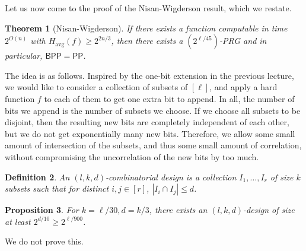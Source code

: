 \documentclass{article}
\newcounter{lecnum}
\newtheorem{theorem}{Theorem}[lecnum]
\newtheorem{proposition}[theorem]{Proposition}
\newtheorem{definition}[theorem]{Definition}
\newcommand{\BPP}{\mathsf{BPP}}
\newcommand{\PP}{\mathsf{PP}}
\newcommand{\avg}{\text{avg}}
\begin{document}
		Let us now come to the proof of the Nisan-Wigderson result, which we restate.
		\begin{theorem}[Nisan-Wigderson]
			\label{theo: hard to prg}
			If there exists a function computable in time $2^{O(n)}$ with $H_\avg(f) \ge 2^{2n/3}$, then there exists a $(2^{\ell/45})$-PRG and in particular, $\BPP = \PP$.
		\end{theorem}
	

		The idea is as follows. Inspired by the one-bit extension in the previous lecture, we would like to consider a collection of subsets of $[\ell]$, and apply a hard function $f$ to each of them to get one extra bit to append. In all, the number of bits we append is the number of subsets we choose. If we choose all subsets to be disjoint, then the resulting new bits are completely independent of each other, but we do not get exponentially many new bits. Therefore, we allow some small amount of intersection of the subsets, and thus some small amount of correlation, without compromising the uncorrelation of the new bits by too much.

		\begin{definition}
			An \emph{$(l,k,d)$-combinatorial design} is a collection $I_1,\ldots,I_r$ of size $k$ subsets such that for distinct $i,j \in [r]$, $|I_i \cap I_j| \le d$.
		\end{definition}

		\begin{proposition}
			For $k=\ell/30, d=k/3$, there exists an $(l,k,d)$-design of size at least $2^{d/10} \ge 2^{\ell/900}$.
		\end{proposition}
		We do not prove this.
\end{document}
